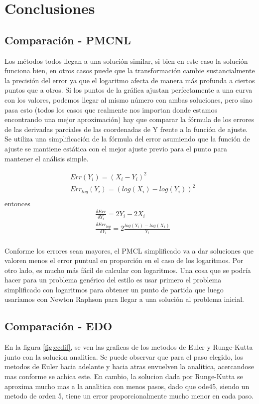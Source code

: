 \documentclass{endm}
\begin{document}
\clearpage
\section{Conclusiones}\label{Conclusiones}

\subsection{Comparación - PMCNL}
Los métodos todos llegan a una solución similar, si bien en este caso la solución funciona bien, en otros casos puede que la transformación cambie sustancialmente la precisión del error ya que el logaritmo afecta de manera más profunda a ciertos puntos que a otros. Si los puntos de la gráfica ajustan perfectamente a una curva con los valores, podemos llegar al mismo número con ambas soluciones, pero sino pasa esto (todos los casos que realmente nos importan donde estamos encontrando una mejor aproximación) hay que comparar la fórmula de los errores de las derivadas parciales de las coordenadas de Y frente a la función de ajuste. Se utiliza una simplificación de la fórmula del error asumiendo que la función de ajuste se mantiene estática con el mejor ajuste previo para el punto para mantener el análisis simple.

\begin{align*}
&Err(Y_i)= (X_i-Y_i)^2\\
&Err_{log}(Y_i)= (log(X_i)-log(Y_i))^2\\
\end{align*}
entonces
\begin{align*}
&\frac{\delta Err}{\delta Y_i} = 2Y_i - 2X_i\\
&\frac{\delta Err_{log}}{\delta Y_i} = 2\frac{log(Y_i)-log(X_i)}{Y_i}\\
\end{align*}

Conforme los errores sean mayores, el PMCL simplificado va a dar soluciones que valoren menos el error puntual en proporción en el caso de los logaritmos. Por otro lado, es mucho más fácil de calcular con logaritmos. Una cosa que se podría hacer para un problema genérico del estilo es usar primero el problema simplificado con logaritmos para obtener un punto de partida que luego usaríamos con Newton Raphson para llegar a una solución al problema inicial.

\subsection{Comparación - EDO}
En la figura \ref{fig:ecdif}, se ven las graficas de los metodos de Euler y Runge-Kutta junto con la solucion analitica. Se puede observar que para el paso elegido, los metodos de Euler hacia adelante y hacia atras envuelven la analitica, acercandose mas conforme se achica este. En cambio, la solucion dada por Runge-Kutta se aproxima mucho mas a la analitica con menos pasos, dado que ode45, siendo un metodo de orden 5, tiene un error proporcionalmente mucho menor en cada paso.
\end{document}

